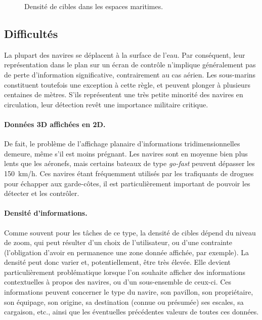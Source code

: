 \begin{figure}[htb]
\begin{subfigure}[t]{0.59\textwidth}
		\label{fig:lincoln}
		\end{subfigure}
		\label{fig:muddyWaters}
		\caption{Densité de cibles dans les espaces maritimes.}
	\end{figure}
	
	
	\subsection{Difficultés}
	La plupart des navires se déplacent à la surface de l'eau. Par conséquent, leur représentation dans le plan sur un écran de contrôle n'implique généralement pas de perte d'information significative, contrairement au cas aérien. Les sous-marins constituent toutefois une exception à cette règle, et peuvent plonger à plusieurs centaines de mètres. S'ils représentent une très petite minorité des navires en circulation, leur détection revêt une importance militaire critique.
	
	\paragraph{Données 3D affichées en 2D.}
	De fait, le problème de l'affichage planaire d'informations tridimensionnelles demeure, même s'il est moins prégnant. Les navires sont en moyenne bien plus lents que les aéronefs, mais certains bateaux de type \emph{go-fast} peuvent dépasser les 150~km/h. Ces navires étant fréquemment utilisés par les trafiquants de drogues pour échapper aux garde-côtes, il est particulièrement important de pouvoir les détecter et les contrôler.
	
	\paragraph{Densité d'informations.}
	Comme souvent pour les tâches de ce type, la densité de cibles dépend du niveau de zoom, qui peut résulter d'un choix de l'utilisateur, ou d'une contrainte (l'obligation d'avoir en permanence une zone donnée affichée, par exemple). La densité peut donc varier et, potentiellement, être très élevée. Elle devient particulièrement problématique lorsque l'on souhaite afficher des informations contextuelles à propos des navires, ou d'un sous-ensemble de ceux-ci. Ces informations peuvent concerner le type du navire, son pavillon, son propriétaire, son équipage, son origine, sa destination (connue ou présumée) ses escales, sa cargaison, etc., ainsi que les éventuelles précédentes valeurs de toutes ces données.
	
